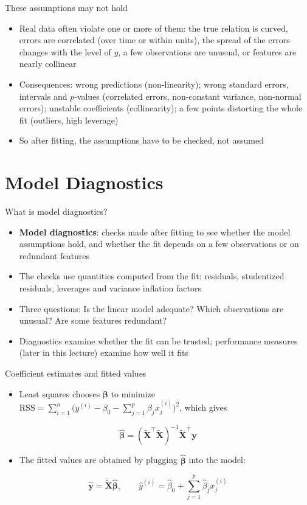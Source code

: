 \begin{frame}{These assumptions may not hold}
    \begin{itemize}
        \item Real data often violate one or more of them: the true relation is curved, errors are correlated (over time or within units), the spread of the errors changes with the level of $y$, a few observations are unusual, or features are nearly collinear
        \item Consequences: wrong predictions (non-linearity); wrong standard errors, intervals and $p$-values (correlated errors, non-constant variance, non-normal errors); unstable coefficients (collinearity); a few points distorting the whole fit (outliers, high leverage)
        \item So after fitting, the assumptions have to be checked, not assumed
    \end{itemize}
\end{frame}


\section{Model Diagnostics}


\begin{frame}{What is model diagnostics?}
    \begin{itemize}
        \item \textbf{Model diagnostics}: checks made after fitting to see whether the model assumptions hold, and whether the fit depends on a few observations or on redundant features
        \item The checks use quantities computed from the fit: residuals, studentized residuals, leverages and variance inflation factors
        \item Three questions: Is the linear model adequate? Which observations are unusual? Are some features redundant?
        \item Diagnostics examine whether the fit can be trusted; performance measures (later in this lecture) examine how well it fits
    \end{itemize}
\end{frame}


\begin{frame}{Coefficient estimates and fitted values}
    \begin{itemize}
        \item Least squares chooses $\symbf{\beta}$ to minimize $\mathrm{RSS} = \sum_{i=1}^{n} \big(y^{(i)} - \beta_0 - \sum_{j=1}^{p} \beta_j x_j^{(i)}\big)^2$, which gives
    \end{itemize}
    \[
        \hat{\symbf{\beta}} = (\tilde{\mathbf{X}}^\top \tilde{\mathbf{X}})^{-1} \tilde{\mathbf{X}}^\top \mathbf{y}
    \]
    \begin{itemize}
        \item The fitted values are obtained by plugging $\hat{\symbf{\beta}}$ into the model:
    \end{itemize}
    \[
        \hat{\mathbf{y}} = \tilde{\mathbf{X}}\hat{\symbf{\beta}}, \qquad \hat{y}^{(i)} = \hat\beta_0 + \sum_{j=1}^{p} \hat\beta_j x_j^{(i)}
    \]
\end{frame}


